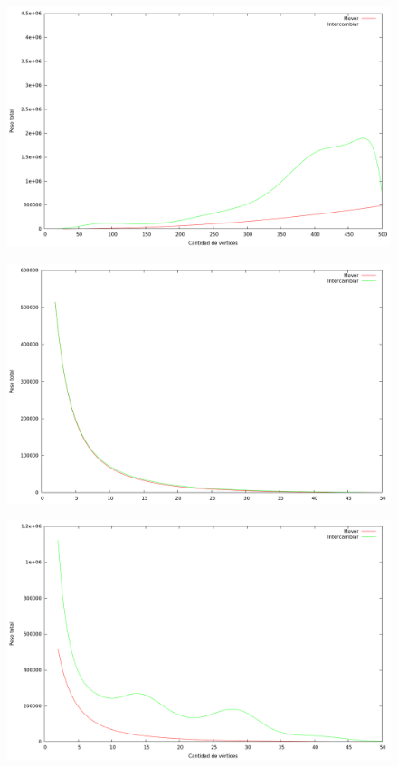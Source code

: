 \begin{figure}[H]
  \begin{center}
    \includegraphics[scale=0.35]{imagenes/local-random-n-peso.png}
  \end{center}
\end{figure}

\begin{figure}[H]
  \begin{center}
    \includegraphics[scale=0.35]{imagenes/local-goloso-k-peso.png}
  \end{center}
\end{figure}

\begin{figure}[H]
  \begin{center}
    \includegraphics[scale=0.35]{imagenes/local-random-k-peso.png}
  \end{center}
\end{figure}

